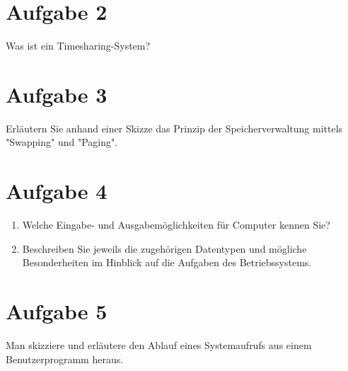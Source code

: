 \section{Aufgabe 2}

Was ist ein Timesharing-System?

\section{Aufgabe 3}

Erläutern Sie anhand einer Skizze das Prinzip der Speicherverwaltung mittels
"Swapping" und "Paging".

\section{Aufgabe 4}

\begin{enumerate}
    \item Welche Eingabe- und Ausgabemöglichkeiten für Computer kennen Sie?
    \item Beschreiben Sie jeweils die zugehörigen Datentypen und mögliche Besonderheiten
          im Hinblick auf die Aufgaben des Betriebssystems.
\end{enumerate}

\section{Aufgabe 5}

Man skizziere und erläutere den Ablauf eines Systemaufrufs aus einem
Benutzerprogramm heraus.